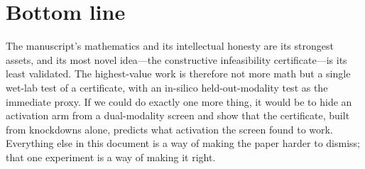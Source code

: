 \documentclass[11pt]{article}
\begin{document}
\section*{Bottom line}
The manuscript's mathematics and its intellectual honesty are its strongest assets, and its
most novel idea---the constructive infeasibility certificate---is its least validated. The
highest-value work is therefore not more math but a single wet-lab test of a certificate, with
an in-silico held-out-modality test as the immediate proxy. If we could do exactly one more
thing, it would be to hide an activation arm from a dual-modality screen and show that the
certificate, built from knockdowns alone, predicts what activation the screen found to work.
Everything else in this document is a way of making the paper harder to dismiss; that one
experiment is a way of making it right.
\end{document}
